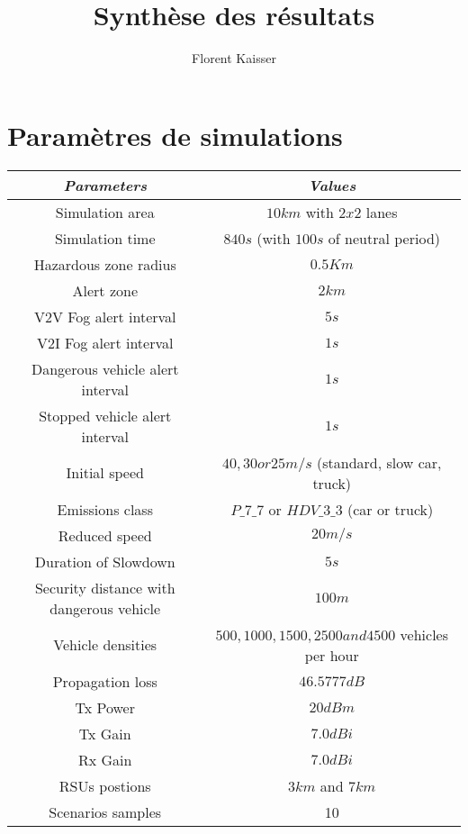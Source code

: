 \documentclass[a4paper,10pt]{article}
\title{Synthèse des résultats}
\author{Florent Kaisser}
\begin{document}
\maketitle


\section{Paramètres de simulations}

\begin{table}[h!]
\label{tab:parametres}
\begin{center}
\begin{tabular}{|c||c|}
  \hline
   \emph{Parameters}&\emph{Values}\\
\hline
Simulation area& $10 km$ with $2x2$ lanes\\
  \hline
Simulation time& $840 s$ (with  $100 s$ of neutral period)\\
\hline
Hazardous zone radius& $0.5 Km$\\
\hline
Alert zone & $2 km$\\
\hline
V2V Fog alert interval & $5s$\\
\hline
V2I Fog alert interval & $1s$\\
\hline
Dangerous vehicle alert interval & $1s$\\
\hline
Stopped vehicle alert interval & $1s$\\
\hline
Initial speed & $40, 30 or 25 m/s$   (standard, slow car, truck) \\
\hline
Emissions class& $P\_7\_7$ or $HDV\_3\_3$  (car or truck) \\
\hline
Reduced speed & $20m/s$\\
\hline
Duration of Slowdown & $5s$\\
\hline
Security distance with dangerous vehicle & $100 m$\\
\hline
Vehicle densities & $500,1000,1500,2500 and 4500 $ vehicles per hour\\ 
\hline
Propagation loss & $46.5777dB$\\
\hline
Tx Power & $20 dBm$\\
\hline
Tx Gain & $ 7.0 dBi$\\
\hline
Rx Gain & $7.0 dBi$\\
\hline
RSUs postions  & $3 km$ and $7 km$ \\
\hline
Scenarios samples & 10 \\
\hline
 
\end{tabular}
\end{center}
\end{table}
\end{document}
